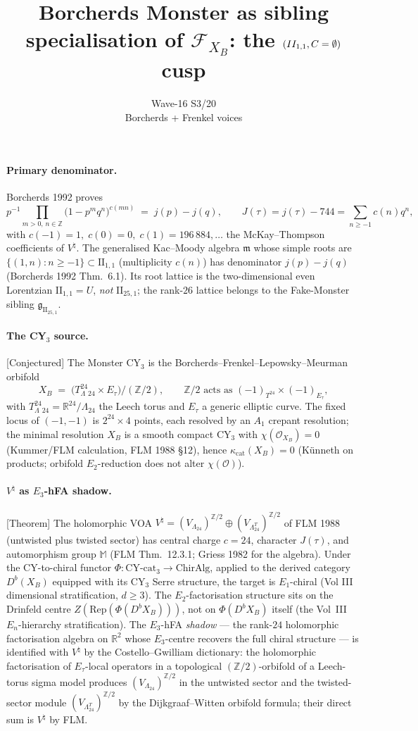 \documentclass[11pt]{article}
\title{Borcherds Monster as sibling specialisation of
$\mathcal{F}_{X_B}$: the $(\IIonel,C=\emptyset)$ cusp}
\author{Wave-16 S3/20 \\ Borcherds + Frenkel voices}
\date{}
\providecommand{\Z}{\mathbb{Z}}
\providecommand{\R}{\mathbb{R}}
\providecommand{\Leech}{\Lambda_{24}}
\providecommand{\IIlor}{\mathrm{II}_{25,1}}
\providecommand{\IIonel}{\mathrm{II}_{1,1}}
\providecommand{\gBKM}{\mathfrak{g}}
\providecommand{\mMon}{\mathfrak{m}}
\providecommand{\VLam}{V_\Leech}
\providecommand{\Vnat}{V^{\natural}}
\providecommand{\Mon}{\mathbb{M}}
\providecommand{\kcat}{\kappa_{\mathrm{cat}}}
\providecommand{\Phii}{\Phi}
\providecommand{\ClaimStatusTheorem}{[Theorem]}
\providecommand{\ClaimStatusConjectured}{[Conjectured]}
\theoremstyle{plain}
\theoremstyle{definition}
\begin{document}
\maketitle

\paragraph{Primary denominator.} Borcherds 1992 proves
\[
  p^{-1}\!\!\prod_{m>0,\,n\in\Z}\!\!\bigl(1-p^m q^n\bigr)^{c(mn)}
  \;=\; j(p) - j(q),\qquad
  J(\tau)=j(\tau)-744=\sum_{n\ge-1} c(n)q^n,
\]
with $c(-1)=1,\;c(0)=0,\;c(1)=196\,884,\dots$ the McKay--Thompson
coefficients of $\Vnat$. The generalised Kac--Moody algebra
$\mMon$ whose simple roots are $\{(1,n): n\ge-1\}\subset\IIonel$
(multiplicity $c(n)$) has denominator $j(p)-j(q)$ (Borcherds 1992
Thm.~6.1). Its root lattice is the two-dimensional even Lorentzian
$\IIonel=U$, \emph{not} $\IIlor$; the rank-$26$ lattice belongs to
the Fake-Monster sibling $\gBKM_{\IIlor}$.

\paragraph{The CY$_3$ source.} \ClaimStatusConjectured{}
The Monster CY$_3$ is the Borcherds--Frenkel--Lepowsky--Meurman
orbifold
\[
  X_B \;=\; \bigl(T^{24}_\Leech \times E_\tau\bigr)/(\Z/2),
  \qquad \Z/2 \text{ acts as } (-1)_{T^{24}}\times(-1)_{E_\tau},
\]
with $T^{24}_\Leech=\R^{24}/\Leech$ the Leech torus and $E_\tau$
a generic elliptic curve. The fixed locus of $(-1,-1)$ is
$2^{24}\times 4$ points, each resolved by an $A_1$ crepant
resolution; the minimal resolution $X_B$ is a smooth compact
CY$_3$ with $\chi(\mathcal{O}_{X_B})=0$ (Kummer/FLM calculation,
FLM 1988 \S 12), hence $\kcat(X_B)=0$ (Künneth on products;
orbifold $E_2$-reduction does not alter $\chi(\mathcal{O})$).

\paragraph{$V^\natural$ as $E_3$-hFA shadow.} \ClaimStatusTheorem{}
The holomorphic VOA $\Vnat=(\VLam)^{\Z/2}\oplus(\VLam^T)^{\Z/2}$
of FLM 1988 (untwisted plus twisted sector) has central charge
$c=24$, character $J(\tau)$, and automorphism group $\Mon$ (FLM
Thm.~12.3.1; Griess 1982 for the algebra). Under the CY-to-chiral
functor $\Phii:\mathrm{CY}\text{-cat}_3\to\mathrm{ChirAlg}$, applied
to the derived category $D^b(X_B)$ equipped with its CY$_3$ Serre
structure, the target is $E_1$-chiral (Vol III dimensional
stratification, $d\ge3$). The $E_2$-factorisation structure sits
on the Drinfeld centre $Z(\mathrm{Rep}(\Phii(D^b X_B)))$, not on
$\Phii(D^b X_B)$ itself (the Vol~III $E_n$-hierarchy stratification). The
$E_3$-hFA \emph{shadow} --- the rank-$24$ holomorphic
factorisation algebra on $\R^2$ whose $E_3$-centre recovers the
full chiral structure --- is identified with $\Vnat$
by the Costello--Gwilliam dictionary: the holomorphic
factorisation of $E_\tau$-local operators in a topological
$(\Z/2)$-orbifold of a Leech-torus sigma model produces
$(\VLam)^{\Z/2}$ in the untwisted sector and the twisted-sector
module $(\VLam^T)^{\Z/2}$ by the Dijkgraaf--Witten orbifold
formula; their direct sum is $\Vnat$ by FLM.
\end{document}
